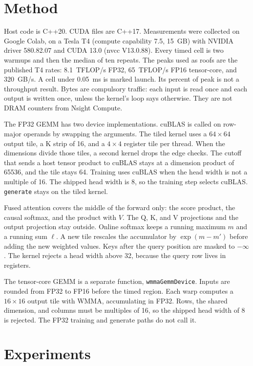 \documentclass[11pt]{article}
\begin{document}
\section{Method}

Host code is C++20. CUDA files are C++17.
Measurements were collected on Google Colab, on a Tesla T4 (compute capability 7.5, 15~GB) with NVIDIA driver 580.82.07 and CUDA 13.0 (nvcc V13.0.88).
Every timed cell is two warmups and then the median of ten repeats.
The peaks used as roofs are the published T4 rates: 8.1~TFLOP/s FP32, 65~TFLOP/s FP16 tensor-core, and 320~GB/s.
A cell under 0.05~ms is marked launch. Its percent of peak is not a throughput result.
Bytes are compulsory traffic: each input is read once and each output is written once, unless the kernel's loop says otherwise.
They are not DRAM counters from Nsight Compute.

The FP32 GEMM has two device implementations.
cuBLAS is called on row-major operands by swapping the arguments.
The tiled kernel uses a $64 \times 64$ output tile, a K strip of 16, and a $4 \times 4$ register tile per thread.
When the dimensions divide those tiles, a second kernel drops the edge checks.
The cutoff that sends a host tensor product to cuBLAS stays at a dimension product of 65536, and the tile stays 64.
Training uses cuBLAS when the head width is not a multiple of 16.
The shipped head width is 8, so the training step selects cuBLAS.
\texttt{generate} stays on the tiled kernel.

Fused attention covers the middle of the forward only: the score product, the causal softmax, and the product with $V$.
The Q, K, and V projections and the output projection stay outside.
Online softmax keeps a running maximum $m$ and a running sum $\ell$.
A new tile rescales the accumulator by $\exp(m - m')$ before adding the new weighted values.
Keys after the query position are masked to $-\infty$.
The kernel rejects a head width above 32, because the query row lives in registers.

The tensor-core GEMM is a separate function, \texttt{wmmaGemmDevice}.
Inputs are rounded from FP32 to FP16 before the timed region.
Each warp computes a $16 \times 16$ output tile with WMMA, accumulating in FP32.
Rows, the shared dimension, and columns must be multiples of 16, so the shipped head width of 8 is rejected.
The FP32 training and generate paths do not call it.

\section{Experiments}
\end{document}
